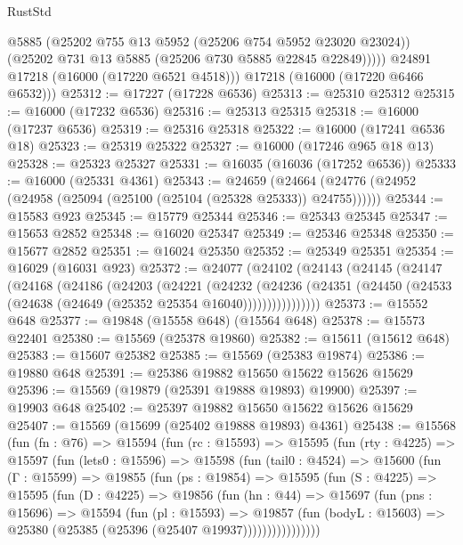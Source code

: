 \begin{lexlean}{RustStd}
\begin{coremodule}
              @5885
              (@25202 @755 @13 @5952 (@25206 @754 @5952 @23020 @23024))
              (@25202 @731 @13 @5885 (@25206 @730 @5885 @22845 @22849)))))
        @24891
        @17218
        (@16000 (@17220 @6521 @4518)))
      @17218
      (@16000 (@17220 @6466 @6532)))
@25312 := @17227 (@17228 @6536)
@25313 := @25310 @25312
@25315 := @16000 (@17232 @6536)
@25316 := @25313 @25315
@25318 := @16000 (@17237 @6536)
@25319 := @25316 @25318
@25322 := @16000 (@17241 @6536 @18)
@25323 := @25319 @25322
@25327 := @16000 (@17246 @965 @18 @13)
@25328 := @25323 @25327
@25331 := @16035 (@16036 (@17252 @6536))
@25333 := @16000 (@25331 @4361)
@25343 := @24659
    (@24664 (@24776 (@24952 (@24958 (@25094 (@25100 (@25104 (@25328 @25333)) @24755))))))
@25344 := @15583 @923
@25345 := @15779 @25344
@25346 := @25343 @25345
@25347 := @15653 @2852
@25348 := @16020 @25347
@25349 := @25346 @25348
@25350 := @15677 @2852
@25351 := @16024 @25350
@25352 := @25349 @25351
@25354 := @16029 (@16031 @923)
@25372 := @24077
    (@24102
      (@24143
        (@24145
          (@24147
            (@24168
              (@24186
                (@24203
                  (@24221
                    (@24232
                      (@24236
                        (@24351
                          (@24450 (@24533 (@24638 (@24649 (@25352 @25354 @16040))))))))))))))))
@25373 := @15552 @648
@25377 := @19848 (@15558 @648) (@15564 @648)
@25378 := @15573 @22401
@25380 := @15569 (@25378 @19860)
@25382 := @15611 (@15612 @648)
@25383 := @15607 @25382
@25385 := @15569 (@25383 @19874)
@25386 := @19880 @648
@25391 := @25386 @19882 @15650 @15622 @15626 @15629
@25396 := @15569 (@19879 (@25391 @19888 @19893) @19900)
@25397 := @19903 @648
@25402 := @25397 @19882 @15650 @15622 @15626 @15629
@25407 := @15569 (@15699 (@25402 @19888 @19893) @4361)
@25438 := @15568
    (fun (fn : @76) =>
    @15594
      (fun (rc : @15593) =>
      @15595
        (fun (rty : @4225) =>
        @15597
          (fun (lets0 : @15596) =>
          @15598
            (fun (tail0 : @4524) =>
            @15600
              (fun (Γ : @15599) =>
              @19855
                (fun (ps : @19854) =>
                @15595
                  (fun (S : @4225) =>
                  @15595
                    (fun (D : @4225) =>
                    @19856
                      (fun (hn : @44) =>
                      @15697
                        (fun (pns : @15696) =>
                        @15594
                          (fun (pl : @15593) =>
                          @19857
                            (fun (bodyL : @15603) =>
                            @25380 (@25385 (@25396 (@25407 @19937))))))))))))))))

\end{coremodule}
\end{lexlean}
